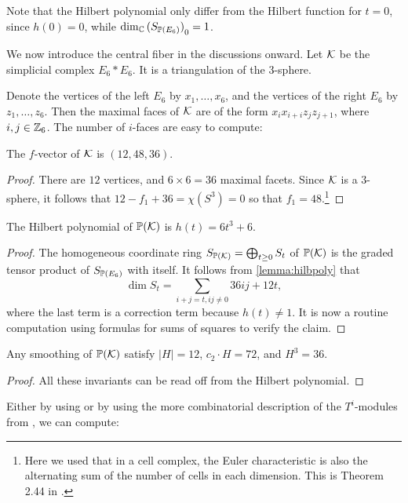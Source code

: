 Note that the Hilbert polynomial only differ from the Hilbert function for $t=0$, since $h(0)=0$, while $\dim_\C {(S_{\P(E_6)})}_0=1$. 

We now introduce the central fiber in the discussions onward. Let $\K$ be the simplicial complex $E_6 \ast E_6$. It is a triangulation of the $3$-sphere.

Denote the  vertices of the left $E_6$ by $x_1,\ldots,x_6$, and the vertices of the right $E_6$ by $z_1,\ldots,z_6$. Then the maximal faces of $\K$ are of the form $x_ix_{i+i}z_jz_{j+1}$, where $i,j \in \Z_6$. The number of $i$-faces are easy to compute:

\begin{lemma}
The $f$-vector of $\K$ is $(12,48,36)$. 
\end{lemma}
\begin{proof}
There are $12$ vertices, and $6 \times 6=36$ maximal facets. Since $\K$ is a 3-sphere, it follows that $12-f_1+36=\chi(S^3)=0$ so that $f_1=48$.\footnote{Here we used that in a cell complex, the Euler characteristic is also the alternating sum of the number of cells in each dimension. This is Theorem 2.44 in \cite{hatcher_topology}.}
\end{proof}

\begin{lemma}
The Hilbert polynomial of $\P(\K)$ is $h(t)=6t^3+6$.
\end{lemma}
\begin{proof}
The homogeneous coordinate ring $S_{\P(\K)}= \bigoplus_{t \geq 0} S_t$ of $\P(\K)$ is the graded tensor product of $S_{\P(E_6)}$ with itself. It follows from \cref{lemma:hilbpoly} that
\[
\dim S_t = \sum_{i+j=t, ij \neq 0} 36ij + 12t,
\]
where the last term is a correction term because $h(t) \neq 1$. It is now a routine computation using formulas for sums of squares to verify the claim.
\end{proof}

\begin{corollary}
Any smoothing of $\P(\K)$ satisfy $|H|=12$, $c_2 \cdot H = 72$, and $H^3=36$.
\end{corollary}
\begin{proof}
All these invariants can be read off from the Hilbert polynomial.
\end{proof}

Either by using \MM or by using the more combinatorial description of the $T^i$-modules from \cite{deforming_christophersen}, we can compute: 

